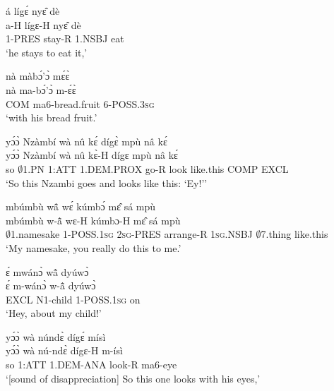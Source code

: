 \begin{exe} 
\exN\label{99}
  \glll á lígɛ́ nyɛ̂ dè \\
        a-H lígɛ-H nyɛ̂ dè \\
       1-PRES stay-R 1.NSBJ eat  \\
    \trans `he stays to eat it,'
\end{exe}

\begin{exe} 
\exN\label{100}
  \glll nà màbɔ́'ɔ̀ mɛ́ɛ̀ \\
       nà ma-bɔ́'ɔ̀ m-ɛ́ɛ̀ \\
       COM ma6-bread.fruit 6-POSS.3\textsc{sg} \\
    \trans `with his bread fruit.'
\end{exe}

\begin{exe} 
\exN\label{101}
  \glll yɔ́ɔ̀ Nzàmbí wà nû kɛ́ dígɛ̀ mpù nâ kɛ́ \\
       yɔ́ɔ̀ Nzàmbí wà nû kɛ̀-H dígɛ mpù nâ kɛ́ \\
       so $\emptyset$1.PN 1:ATT 1.DEM.PROX go-R look like.this COMP EXCL\\
    \trans `So this Nzambi goes and looks like this: `Ey!''
\end{exe}

\begin{exe} 
\exN\label{102}
  \glll mbúmbù wã̂ wɛ́ kúmbɔ́ mɛ̂ sá mpù \\
          mbúmbù w-ã̂ wɛ-H kúmbɔ-H mɛ̂ sá mpù \\
        $\emptyset$1.namesake 1-POSS.1\textsc{sg} 2\textsc{sg}-PRES arrange-R 1\textsc{sg}.NSBJ $\emptyset$7.thing like.this \\
    \trans `My namesake, you really do this to me.'
\end{exe}

\begin{exe} 
\exN\label{103}
  \glll ɛ́ mwánɔ̀ wã̂ dyúwɔ̀ \\
       ɛ́ m-wánɔ̀ w-ã̂ dyúwɔ̀ \\
        EXCL N1-child 1-POSS.1\textsc{sg} on \\
    \trans `Hey, about my child!'
\end{exe}

\begin{exe} 
\exN\label{104}
  \glll [clicking] yɔ́ɔ̀ wà núndɛ̀ dígɛ́ mísì  \\
     [clicking] yɔ́ɔ̀ wà nú-ndɛ̀ dígɛ-H m-ísì \\
      [clicking] so 1:ATT 1.DEM-ANA look-R ma6-eye \\
    \trans `[sound of disappreciation] So this one looks with his eyes,'
\end{exe}

